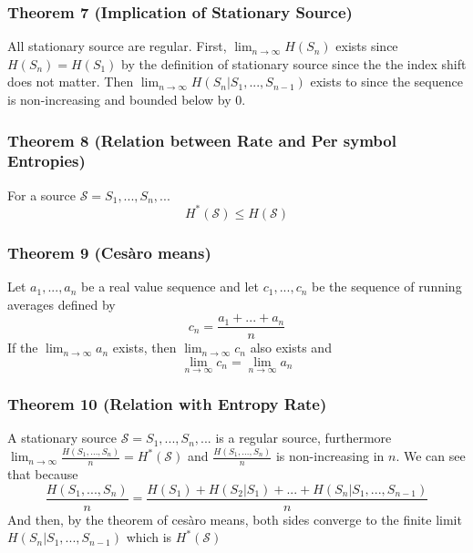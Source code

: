 \documentclass{article}
\begin{document}
\subsubsection{Theorem 7 (Implication of Stationary Source)}
\begin{tcolorbox}[sharp corners, colback=green!30, colframe=green!80!blue, title=Stationary implies Regular]
All stationary source are regular. First, $ \lim_{n \to \infty}H(S_n) $ exists since $ H(S_n) = H(S_1) $ by the definition of stationary source since the the index shift does not matter. Then $ \lim_{n \to \infty}H(S_n | S_1,...,S_{n-1}) $ exists to since the sequence is non-increasing and bounded below by 0.
\end{tcolorbox}

\subsubsection{Theorem 8 (Relation between Rate and Per symbol Entropies)}
\begin{tcolorbox}[width=12.1cm, leftrule=3mm]
For a source $ \mathcal{S} = S_1,...,S_n,... $
\begin{equation}
H^{*}(\mathcal{S}) \leq H(\mathcal{S})
\end{equation} 
\end{tcolorbox}

\subsubsection{Theorem 9 (Cesàro means)} Let $ a_1,...,a_n $ be a real value sequence and let $ c_1,...,c_n $ be the sequence of running averages defined by
\begin{equation}
c_n = \frac{a_1 + ... + a_n}{n}
\end{equation}
If the $ \lim_{n \to \infty}a_n $ exists, then $ \lim_{n \to \infty}c_n $ also exists and
\begin{equation}
\lim_{n \to \infty}c_n = \lim_{n \to \infty}a_n
\end{equation}

\subsubsection{Theorem 10 (Relation with Entropy Rate)} 
\begin{tcolorbox}[sharp corners, colback=green!30, colframe=green!80!blue, title=Relation with Entropy Rate]
A stationary source $ \mathcal{S} = S_1,...,S_n,... $ is a regular source, furthermore $ \lim_{n \to \infty}\frac{H(S_1,...,S_n)}{n} = H^{*}(\mathcal{S}) $ and $ \frac{H(S_1,...,S_n)}{n} $ is non-increasing in $ n $. We can see that because 
\begin{equation}
\frac{H(S_1,...,S_n)}{n} = \frac{H(S_1) + H(S_2 | S_1) + ... + H(S_n | S_1,...,S_{n-1})}{n}
\end{equation}
And then, by the theorem of cesàro means, both sides converge to the finite limit $ H(S_n | S_1,...,S_{n-1}) $ which is $ H^{*}(\mathcal{S}) $
\end{tcolorbox}
\end{document}
